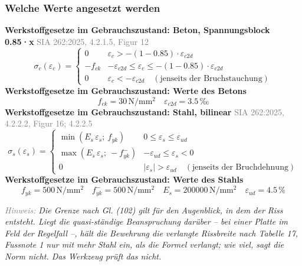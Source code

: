 \documentclass[11pt,a4paper]{article}
\newcommand{\normref}[1]{{\small\textcolor{gray}{#1}}}
\newcommand{\hinweis}[2]{\par\noindent\textcolor{gray}{\textit{#1:}} \textit{#2}\par}
\begin{document}
\subsubsection{Welche Werte angesetzt werden}
\noindent\textbf{Werkstoffgesetze im Gebrauchszustand: Beton, Spannungsblock 0.85·x} \hfill \normref{SIA 262:2025, 4.2.1.5, Figur 12}
\begin{equation*}
\sigma_c(\varepsilon_c) = \begin{cases} 0 & \varepsilon_c > -(1 - 0.85) \cdot \varepsilon_{c2d} \\[1ex] -f_{ck} & -\varepsilon_{c2d} \le \varepsilon_c \le -(1 - 0.85) \cdot \varepsilon_{c2d} \\[1ex] 0 & \varepsilon_c < -\varepsilon_{c2d} \quad (\text{jenseits der Bruchstauchung}) \end{cases}
\end{equation*}
\noindent\textbf{Werkstoffgesetze im Gebrauchszustand: Werte des Betons}
\begin{equation*}
f_{ck} = 30\,\mathrm{N}/\mathrm{mm}^{2} \quad \varepsilon_{c2d} = 3.5\,\text{‰}
\end{equation*}
\noindent\textbf{Werkstoffgesetze im Gebrauchszustand: Stahl, bilinear} \hfill \normref{SIA 262:2025, 4.2.2.2, Figur 16; 4.2.2.5}
\begin{equation*}
\sigma_s(\varepsilon_s) = \begin{cases} \min(E_s\,\varepsilon_s;\ f_{yk}) & 0 \le \varepsilon_s \le \varepsilon_{ud} \\[1ex] \max(E_s\,\varepsilon_s;\ -f_{yk}^{-}) & -\varepsilon_{ud} \le \varepsilon_s < 0 \\[1ex] 0 & |\varepsilon_s| > \varepsilon_{ud} \quad (\text{jenseits der Bruchdehnung}) \end{cases}
\end{equation*}
\noindent\textbf{Werkstoffgesetze im Gebrauchszustand: Werte des Stahls}
\begin{equation*}
f_{yk} = 500\,\mathrm{N}/\mathrm{mm}^{2} \quad f_{yk}^{-} = 500\,\mathrm{N}/\mathrm{mm}^{2} \quad E_s = 200000\,\mathrm{N}/\mathrm{mm}^{2} \quad \varepsilon_{ud} = 4.5\,\%
\end{equation*}
\hinweis{Hinweis}{Die Grenze nach Gl. (102) gilt für den Augenblick, in dem der Riss entsteht. Liegt die quasi-ständige Beanspruchung darüber – bei einer Platte im Feld der Regelfall –, hält die Bewehrung die verlangte Rissbreite nach Tabelle 17, Fussnote 1 nur mit mehr Stahl ein, als die Formel verlangt; wie viel, sagt die Norm nicht. Das Werkzeug prüft das nicht.}
\end{document}
